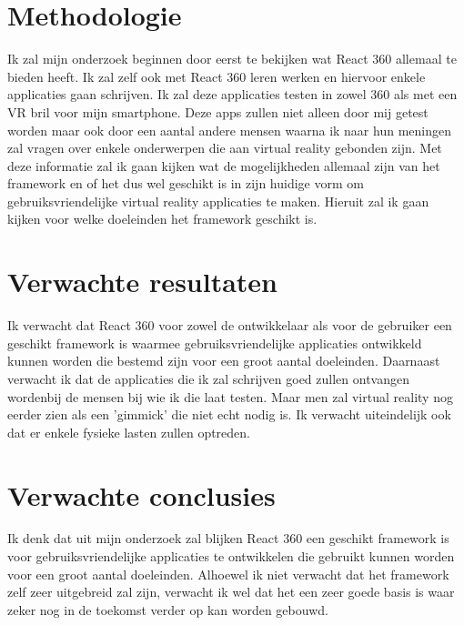 \section{Methodologie}
\label{sec:methodologie}

Ik zal mijn onderzoek beginnen door eerst te bekijken wat React 360 allemaal te bieden heeft. Ik zal zelf ook met React 360 leren werken en hiervoor enkele applicaties gaan schrijven. Ik zal deze applicaties testen in zowel 360\textdegree \hspace{0em} als met een VR bril voor mijn smartphone. Deze apps zullen niet alleen door mij getest worden maar ook door een aantal andere mensen waarna ik naar hun meningen zal vragen over enkele onderwerpen die aan virtual reality gebonden zijn. Met deze informatie zal ik gaan kijken wat de mogelijkheden allemaal zijn van het framework en of het dus wel geschikt is in zijn huidige vorm om gebruiksvriendelijke virtual reality applicaties te maken. Hieruit zal ik gaan kijken voor welke doeleinden het framework geschikt is.

\section{Verwachte resultaten}
\label{sec:verwachte_resultaten}

Ik verwacht dat React 360 voor zowel de ontwikkelaar als voor de gebruiker een geschikt framework is waarmee gebruiksvriendelijke applicaties ontwikkeld kunnen worden die bestemd zijn voor een groot aantal doeleinden. Daarnaast verwacht ik dat de applicaties die ik zal schrijven goed zullen ontvangen wordenbij de mensen bij wie ik die laat testen. Maar men zal virtual reality nog eerder zien als een 'gimmick' die niet echt nodig is. Ik verwacht uiteindelijk ook dat er enkele fysieke lasten zullen optreden.
\section{Verwachte conclusies}
\label{sec:verwachte_conclusies}

Ik denk dat uit mijn onderzoek zal blijken React 360 een geschikt framework is voor gebruiksvriendelijke applicaties te ontwikkelen die gebruikt kunnen worden voor een groot aantal doeleinden. Alhoewel ik niet verwacht dat het framework zelf zeer uitgebreid zal zijn, verwacht ik wel dat het een zeer goede basis is waar zeker nog in de toekomst verder op kan worden gebouwd.
